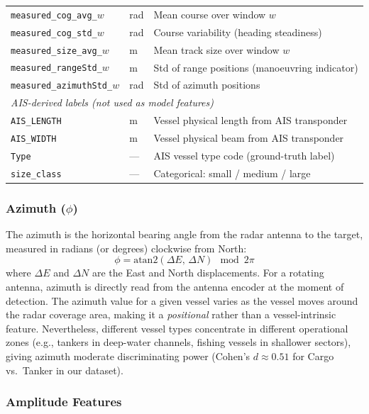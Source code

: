 \documentclass[12pt, a4paper]{article}
\begin{document}
\begin{table}[H]
\begin{tabular}{llp{7cm}}
\texttt{measured\_cog\_avg\_$w$}    & rad & Mean course over window $w$ \\
\texttt{measured\_cog\_std\_$w$}    & rad & Course variability (heading steadiness) \\
\texttt{measured\_size\_avg\_$w$}   & m   & Mean track size over window $w$ \\
\texttt{measured\_rangeStd\_$w$}    & m   & Std of range positions (manoeuvring indicator) \\
\texttt{measured\_azimuthStd\_$w$}  & rad & Std of azimuth positions \\
\midrule
\multicolumn{3}{l}{\textit{AIS-derived labels (not used as model features)}} \\
\texttt{AIS\_LENGTH}        & m           & Vessel physical length from AIS transponder \\
\texttt{AIS\_WIDTH}         & m           & Vessel physical beam from AIS transponder \\
\texttt{Type}               & —           & AIS vessel type code (ground-truth label) \\
\texttt{size\_class}        & —           & Categorical: small / medium / large \\
\bottomrule
\end{tabular}
\end{table}

\subsubsection{Azimuth ($\phi$)}

The azimuth is the horizontal bearing angle from the radar antenna to the target,
measured in radians (or degrees) clockwise from North:
\begin{equation}
    \phi = \text{atan2}(\Delta E,\, \Delta N) \mod 2\pi
\end{equation}
where $\Delta E$ and $\Delta N$ are the East and North displacements.
For a rotating antenna, azimuth is directly read from the antenna encoder at
the moment of detection. The azimuth value for a given vessel varies as the
vessel moves around the radar coverage area, making it a \emph{positional}
rather than a vessel-intrinsic feature. Nevertheless, different vessel types
concentrate in different operational zones (e.g., tankers in deep-water channels,
fishing vessels in shallower sectors), giving azimuth moderate discriminating
power (Cohen's $d \approx 0.51$ for Cargo vs.\ Tanker in our dataset).

\subsubsection{Amplitude Features}
\end{document}
